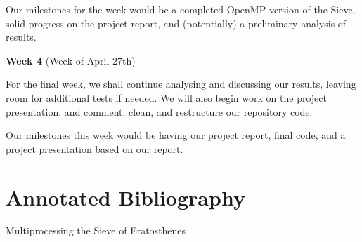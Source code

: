 \documentclass[11pt]{article}
\newenvironment{my_enumerate}{
  \begin{enumerate}
    \setlength{\itemsep}{1pt}
      \setlength{\parskip}{0pt}
\setlength{\parsep}{0pt}}{\end{enumerate}
}
\begin{document}
\begin{my_enumerate}
     Our milestones for the week would be a completed OpenMP version of the Sieve,
     solid progress on the project report, and (potentially) a preliminary analysis
     of results.
     \vspace{0.1in}
    
    \item \textbf{Week 4} (Week of April 27th)
    
     For the final week, we shall continue analysing and discussing our results, 
     leaving room for additional tests if needed. We will also begin work on the 
     project presentation, and comment, clean, and restructure our repository code.
     
     Our milestones this week would be having our project report, final code, and a
     project presentation based on our report.
    
\end{my_enumerate}





\newpage 

\onecolumn
\section*{Annotated Bibliography}\label{annon} 

Multiprocessing the Sieve of Eratosthenes
\end{document}
